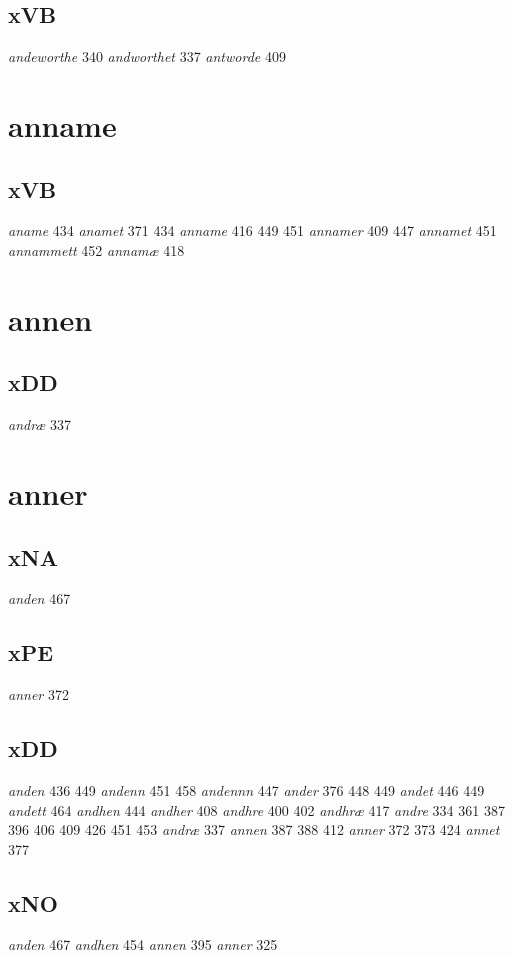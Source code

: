 \documentclass[a4paper,twocolumn]{article}
\begin{document}
\subsection{xVB}
\label{sec:orgc53c17a}
\emph{andeworthe} 340 \emph{andworthet} 337 \emph{antworde} 409 
\section{anname}
\label{sec:org3ef887f}
\subsection{xVB}
\label{sec:org99f198b}
\emph{aname} 434 \emph{anamet} 371 434 \emph{anname} 416 449 451 \emph{annamer} 409 447 \emph{annamet} 451 \emph{annammett} 452 \emph{annamæ} 418 
\section{annen}
\label{sec:org88ec6dd}
\subsection{xDD}
\label{sec:orgbd4b074}
\emph{andræ} 337 
\section{anner}
\label{sec:orgb8e8677}
\subsection{xNA}
\label{sec:org9bef6d3}
\emph{anden} 467 
\subsection{xPE}
\label{sec:org3964a46}
\emph{anner} 372 
\subsection{xDD}
\label{sec:orgc98c600}
\emph{anden} 436 449 \emph{andenn} 451 458 \emph{andennn} 447 \emph{ander} 376 448 449 \emph{andet} 446 449 \emph{andett} 464 \emph{andhen} 444 \emph{andher} 408 \emph{andhre} 400 402 \emph{andhræ} 417 \emph{andre} 334 361 387 396 406 409 426 451 453 \emph{andræ} 337 \emph{annen} 387 388 412 \emph{anner} 372 373 424 \emph{annet} 377 
\subsection{xNO}
\label{sec:org8a2ebf6}
\emph{anden} 467 \emph{andhen} 454 \emph{annen} 395 \emph{anner} 325 
\end{document}
